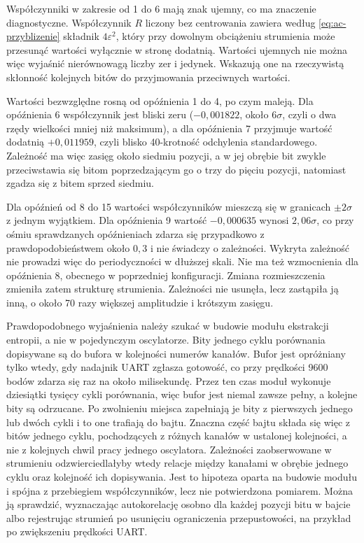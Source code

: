 Współczynniki w zakresie od 1 do 6 mają znak ujemny, co ma znaczenie diagnostyczne.
Współczynnik $R$ liczony bez centrowania zawiera według \eqref{eq:ac-przyblizenie}
składnik $4\varepsilon^2$, który przy dowolnym obciążeniu strumienia może przesunąć
wartości wyłącznie w stronę dodatnią. Wartości ujemnych nie można więc wyjaśnić
nierównowagą liczby zer i jedynek. Wskazują one na rzeczywistą skłonność kolejnych
bitów do przyjmowania przeciwnych wartości.

Wartości bezwzględne rosną od opóźnienia 1 do 4, po czym maleją. Dla opóźnienia 6
współczynnik jest bliski zeru ($-0{,}001822$, około $6\sigma$, czyli o dwa rzędy
wielkości mniej niż maksimum), a dla opóźnienia 7 przyjmuje wartość dodatnią
$+0{,}011959$, czyli blisko 40-krotność odchylenia standardowego. Zależność ma więc
zasięg około siedmiu pozycji, a w jej obrębie bit zwykle przeciwstawia się bitom
poprzedzającym go o trzy do pięciu pozycji, natomiast zgadza się z bitem sprzed siedmiu.

Dla opóźnień od 8 do 15 wartości współczynników mieszczą się w granicach
$\pm 2\sigma$ z jednym wyjątkiem. Dla opóźnienia 9 wartość $-0{,}000635$ wynosi
$2{,}06\sigma$, co przy ośmiu sprawdzanych opóźnieniach zdarza się przypadkowo
z prawdopodobieństwem około $0{,}3$ i nie świadczy o zależności. Wykryta zależność nie
prowadzi więc do periodyczności w dłuższej skali. Nie ma też wzmocnienia dla
opóźnienia 8, obecnego w poprzedniej konfiguracji. Zmiana rozmieszczenia zmieniła
zatem strukturę strumienia. Zależności nie usunęła, lecz zastąpiła ją inną, o około
70 razy większej amplitudzie i krótszym zasięgu.

Prawdopodobnego wyjaśnienia należy szukać w budowie modułu ekstrakcji entropii,
a nie w pojedynczym oscylatorze. Bity jednego cyklu porównania dopisywane są do
bufora w kolejności numerów kanałów. Bufor jest opróżniany tylko wtedy, gdy nadajnik
UART zgłasza gotowość, co przy prędkości 9600 bodów zdarza się raz na około
milisekundę. Przez ten czas moduł wykonuje dziesiątki tysięcy cykli porównania,
więc bufor jest niemal zawsze pełny, a kolejne bity są odrzucane. Po zwolnieniu
miejsca zapełniają je bity z pierwszych jednego lub dwóch cykli i to one trafiają do
bajtu. Znaczna część bajtu składa się więc z bitów jednego cyklu, pochodzących z różnych
kanałów w ustalonej kolejności, a nie z kolejnych chwil pracy jednego oscylatora.
Zależności zaobserwowane w strumieniu odzwierciedlałyby wtedy relacje między kanałami
w obrębie jednego cyklu oraz kolejność ich dopisywania. Jest to hipoteza oparta na
budowie modułu i spójna z przebiegiem współczynników, lecz nie potwierdzona pomiarem.
Można ją sprawdzić, wyznaczając autokorelację osobno dla każdej pozycji bitu w bajcie
albo rejestrując strumień po usunięciu ograniczenia przepustowości, na przykład po
zwiększeniu prędkości UART.

